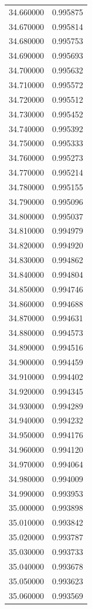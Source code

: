 \begin{tabular}{rr}
34.660000 & 0.995875 \\
34.670000 & 0.995814 \\
34.680000 & 0.995753 \\
34.690000 & 0.995693 \\
34.700000 & 0.995632 \\
34.710000 & 0.995572 \\
34.720000 & 0.995512 \\
34.730000 & 0.995452 \\
34.740000 & 0.995392 \\
34.750000 & 0.995333 \\
34.760000 & 0.995273 \\
34.770000 & 0.995214 \\
34.780000 & 0.995155 \\
34.790000 & 0.995096 \\
34.800000 & 0.995037 \\
34.810000 & 0.994979 \\
34.820000 & 0.994920 \\
34.830000 & 0.994862 \\
34.840000 & 0.994804 \\
34.850000 & 0.994746 \\
34.860000 & 0.994688 \\
34.870000 & 0.994631 \\
34.880000 & 0.994573 \\
34.890000 & 0.994516 \\
34.900000 & 0.994459 \\
34.910000 & 0.994402 \\
34.920000 & 0.994345 \\
34.930000 & 0.994289 \\
34.940000 & 0.994232 \\
34.950000 & 0.994176 \\
34.960000 & 0.994120 \\
34.970000 & 0.994064 \\
34.980000 & 0.994009 \\
34.990000 & 0.993953 \\
35.000000 & 0.993898 \\
35.010000 & 0.993842 \\
35.020000 & 0.993787 \\
35.030000 & 0.993733 \\
35.040000 & 0.993678 \\
35.050000 & 0.993623 \\
35.060000 & 0.993569 \\

\end{tabular}
